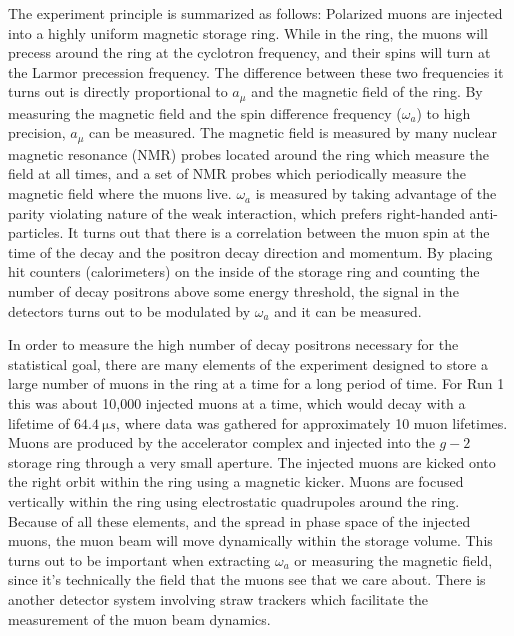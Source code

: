 \documentclass[12pt,letterpaper]{article}
\def\wa{$\omega_{a}$\xspace}
\def\gmtwo{$g-2$\xspace}
\def\amu{$a_{\mu}$\xspace}
\begin{document}
The experiment principle is summarized as follows: Polarized muons are injected into a highly uniform magnetic storage ring. While in the ring, the muons will precess around the ring at the cyclotron frequency, and their spins will turn at the Larmor precession frequency. The difference between these two frequencies it turns out is directly proportional to \amu and the magnetic field of the ring. By measuring the magnetic field and the spin difference frequency (\wa) to high precision, \amu can be measured. The magnetic field is measured by many nuclear magnetic resonance (NMR) probes located around the ring which measure the field at all times, and a set of NMR probes which periodically measure the magnetic field where the muons live. \wa is measured by taking advantage of the parity violating nature of the weak interaction, which prefers right-handed anti-particles. It turns out that there is a correlation between the muon spin at the time of the decay and the positron decay direction and momentum. By placing hit counters (calorimeters) on the inside of the storage ring and counting the number of decay positrons above some energy threshold, the signal in the detectors turns out to be modulated by \wa and it can be measured.


In order to measure the high number of decay positrons necessary for the statistical goal, there are many elements of the experiment designed to store a large number of muons in the ring at a time for a long period of time. For Run 1 this was about 10,000 injected muons at a time, which would decay with a lifetime of $\SI{64.4}{\micro s}$, where data was gathered for approximately 10 muon lifetimes. Muons are produced by the accelerator complex and injected into the \gmtwo storage ring through a very small aperture. The injected muons are kicked onto the right orbit within the ring using a magnetic kicker. Muons are focused vertically within the ring using electrostatic quadrupoles around the ring. Because of all these elements, and the spread in phase space of the injected muons, the muon beam will move dynamically within the storage volume. This turns out to be important when extracting \wa or measuring the magnetic field, since it's technically the field that the muons see that we care about. There is another detector system involving straw trackers which facilitate the measurement of the muon beam dynamics.
\end{document}
